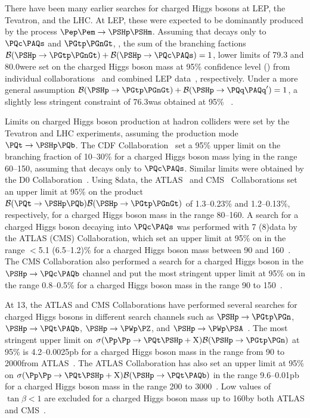There have been many earlier searches for charged Higgs bosons at LEP,
the Tevatron, and the LHC. At LEP, these were expected to be
dominantly produced by the process $\Pep\Pem \to \PSHp\PSHm$. Assuming
that \PSHp decays only to $\PQc\PAQs$ and $\PGtp\PGnGt$, \ie, the sum
of the branching factions $\BHtau +
\BHcs=1$, lower limits of 79.3 and
80.0\GeV were set on the charged Higgs boson mass at 95\% confidence
level (\CL) from individual
collaborations~\cite{Achard:2003gt, Heister:2002ev, Abdallah:2003wd}
and combined LEP data~\cite{Abbiendi:2013hk}, respectively.
Under a more general assumption $\BHtau +
\mathcal{B}(\PSHp \to \PQq\PAQq^\prime)=1$, a slightly less stringent
constraint of 76.3\GeV was obtained at 95\% \CL~\cite{Abbiendi:2008aa}.

Limits on charged Higgs boson production at hadron colliders were set
by the Tevatron and LHC experiments, assuming the production mode
$\PQt \to \PSHp\PQb$. The CDF
Collaboration~\cite{Aaltonen:2009ke} set a 95\% \CL upper limit on the
branching fraction \Bthb of 10--30\% for a
charged Higgs boson mass lying in the range 60--150\GeV, assuming that
\PSHp decays only to $\PQc\PAQs$. Similar limits were obtained
by the D0 Collaboration~\cite{Abazov:2009aa}. Using 8\TeV data, the
ATLAS~\cite{Aad:2014kga} and CMS~\cite{Khachatryan:2015qxa}
Collaborations set an upper limit at 95\% \CL on the product
$\Bthb \BHtau$ of 1.3--0.23\% and 1.2--0.13\%, respectively, for a charged Higgs boson
mass in the range 80--160\GeV. A search for a charged Higgs boson
decaying into $\PQc\PAQs$ was performed with 7 (8)\TeV data by the
ATLAS (CMS) Collaboration, which set an upper limit at 95\% \CL on
\Bthb in the range $<$5.1 (6.5--1.2)\%
for a charged Higgs boson mass between 90 and
160\GeV~\cite{Aad:2013hla,Khachatryan:2015uua}. The CMS Collaboration
also performed a search for a charged Higgs boson in the $\PSHp \to \PQc\PAQb$
channel and put the most stringent upper limit at 95\% \CL on
\Bthb in the range 0.8--0.5\% for a charged
Higgs boson mass in the range 90 to 150\GeV~\cite{Sirunyan:2018dvm}.

At 13\TeV, the ATLAS and CMS Collaborations have performed several
searches for charged Higgs bosons in different
search channels such as $\PSHp \to \PGtp\PGn$, $\PSHp \to \PQt\PAQb$,
$\PSHp \to \PWp\PZ$, and $\PSHp \to \PWp\PSA$~\cite{Aaboud:2016dig,
Aaboud:2018gjj,Aaboud:2018cwk,Sirunyan:2019zdq,Sirunyan:2017sbn,
Sirunyan:2019hkq}.
The most stringent upper limit on $\sigma (\Pp\Pp\to\PQt\PSHp +\text{X})
\mathcal{B}(\PSHp \to \PGtp\PGn)$ at 95\% \CL is
4.2--0.0025\unit{pb} for a charged Higgs boson mass in the range from
90 to 2000\GeV from ATLAS~\cite{Aaboud:2018gjj}. The ATLAS Collaboration 
has also set an upper limit at 95\% \CL on $\sigma (\Pp\Pp\to\PQt\PSHp +\text{X})
\mathcal{B}(\PSHp \to \PQt\PAQb)$ in the range 9.6--0.01\unit{pb} for
a charged Higgs boson mass in the range 200 to 3000\GeV~\cite{Aaboud:2018cwk}.
Low values of $\tan\beta < 1$ are excluded for a charged Higgs boson
mass up to 160\GeV by both ATLAS and CMS~\cite{Aaboud:2018gjj,Sirunyan:2019hkq}.

